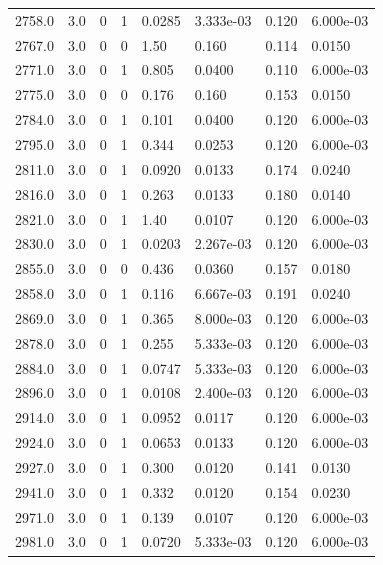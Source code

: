 \documentclass[preview]{standalone}
\begin{document}
{{{{{{\begin{tabular}{L{1.2cm}C{1.2cm} C{0.3cm}C{0.5cm} C{1.4cm}C{1.4cm} C{1.4cm}C{1.4cm}}
  2758.0  &   3.0  & 0     &  1 &  0.0285  & 3.333e-03  & 0.120 &  6.000e-03   \\ 
  2767.0  &   3.0  & 0     &  0 &  1.50  & 0.160  & 0.114 &  0.0150   \\ 
  2771.0  &   3.0  & 0     &  1 &  0.805  & 0.0400  & 0.110 &  6.000e-03   \\ 
  2775.0  &   3.0  & 0     &  0 &  0.176  & 0.160  & 0.153 &  0.0150   \\ 
  2784.0  &   3.0  & 0     &  1 &  0.101  & 0.0400  & 0.120 &  6.000e-03   \\ 
  2795.0  &   3.0  & 0     &  1 &  0.344  & 0.0253  & 0.120 &  6.000e-03   \\ 
  2811.0  &   3.0  & 0     &  1 &  0.0920  & 0.0133  & 0.174 &  0.0240   \\ 
  2816.0  &   3.0  & 0     &  1 &  0.263  & 0.0133  & 0.180 &  0.0140   \\ 
  2821.0  &   3.0  & 0     &  1 &  1.40  & 0.0107  & 0.120 &  6.000e-03   \\ 
  2830.0  &   3.0  & 0     &  1 &  0.0203  & 2.267e-03  & 0.120 &  6.000e-03   \\ 
  2855.0  &   3.0  & 0     &  0 &  0.436  & 0.0360  & 0.157 &  0.0180   \\ 
  2858.0  &   3.0  & 0     &  1 &  0.116  & 6.667e-03  & 0.191 &  0.0240   \\ 
  2869.0  &   3.0  & 0     &  1 &  0.365  & 8.000e-03  & 0.120 &  6.000e-03   \\ 
  2878.0  &   3.0  & 0     &  1 &  0.255  & 5.333e-03  & 0.120 &  6.000e-03   \\ 
  2884.0  &   3.0  & 0     &  1 &  0.0747  & 5.333e-03  & 0.120 &  6.000e-03   \\ 
  2896.0  &   3.0  & 0     &  1 &  0.0108  & 2.400e-03  & 0.120 &  6.000e-03   \\ 
  2914.0  &   3.0  & 0     &  1 &  0.0952  & 0.0117  & 0.120 &  6.000e-03   \\ 
  2924.0  &   3.0  & 0     &  1 &  0.0653  & 0.0133  & 0.120 &  6.000e-03   \\ 
  2927.0  &   3.0  & 0     &  1 &  0.300  & 0.0120  & 0.141 &  0.0130   \\ 
  2941.0  &   3.0  & 0     &  1 &  0.332  & 0.0120  & 0.154 &  0.0230   \\ 
  2971.0  &   3.0  & 0     &  1 &  0.139  & 0.0107  & 0.120 &  6.000e-03   \\ 
  2981.0  &   3.0  & 0     &  1 &  0.0720  & 5.333e-03  & 0.120 &  6.000e-03   \\ 

\end{tabular}}}}}}}
\end{document}
